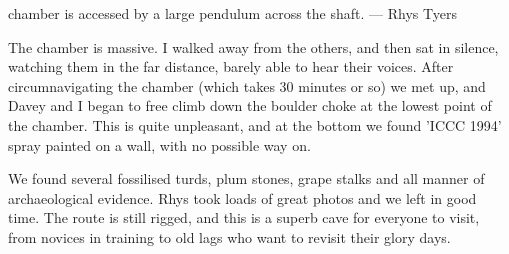 \begin{marginfigure}
\label{Ta Mokra}
\caption{   \protect{} chamber is accessed by a large pendulum across the \protect{} shaft. --- Rhys Tyers}
\end{marginfigure}

The chamber is massive. I walked away from the others, and then sat in silence, watching them in the far distance, barely able to hear their voices. After circumnavigating the chamber (which takes 30 minutes or so) we met up, and Davey and I began to free climb down the boulder choke at the lowest point of the chamber. This is quite unpleasant, and at the bottom we found 'ICCC 1994' spray painted on a wall, with no possible way on.

We found several fossilised turds, plum stones, grape stalks and all manner of archaeological evidence. Rhys took loads of great photos and we left in good time. The route is still rigged, and this is a superb cave for everyone to visit, from novices in training to old lags who want to revisit their glory days.

